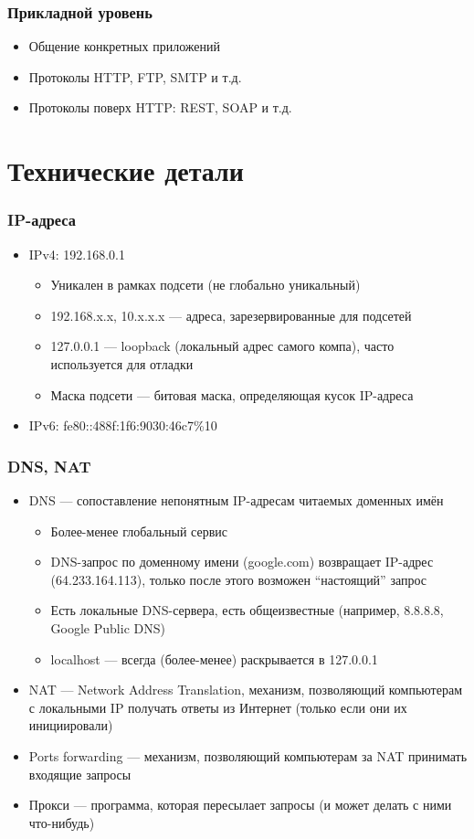\documentclass[xetex,mathserif,serif]{beamer}
\begin{document}
	\begin{frame}
		\frametitle{Прикладной уровень}
		\begin{itemize}
			\item Общение конкретных приложений
			\item Протоколы HTTP, FTP, SMTP и т.д.
			\item Протоколы поверх HTTP: REST, SOAP и т.д.
		\end{itemize}
	\end{frame}

	\section{Технические детали}

	\begin{frame}
		\frametitle{IP-адреса}
		\begin{itemize}
			\item IPv4: 192.168.0.1
			\begin{itemize}
				\item Уникален в рамках подсети (не глобально уникальный)
				\item 192.168.x.x, 10.x.x.x --- адреса, зарезервированные для подсетей
				\item 127.0.0.1 --- loopback (локальный адрес самого компа), часто используется для отладки
				\item Маска подсети --- битовая маска, определяющая кусок IP-адреса
			\end{itemize}
			\item IPv6: fe80::488f:1f6:9030:46c7\%10
		\end{itemize}
	\end{frame}

	\begin{frame}
		\frametitle{DNS, NAT}
		\begin{itemize}
			\item DNS --- сопоставление непонятным IP-адресам читаемых доменных имён
			\begin{itemize}
				\item Более-менее глобальный сервис
				\item DNS-запрос по доменному имени (google.com) возвращает IP-адрес (64.233.164.113), только после этого возможен ``настоящий'' запрос
				\item Есть локальные DNS-сервера, есть общеизвестные (например, 8.8.8.8, Google Public DNS)
				\item localhost --- всегда (более-менее) раскрывается в 127.0.0.1
			\end{itemize}
			\item NAT --- Network Address Translation, механизм, позволяющий компьютерам с локальными IP получать ответы из Интернет (только если они их инициировали)
			\item Ports forwarding --- механизм, позволяющий компьютерам за NAT принимать входящие запросы
			\item Прокси --- программа, которая пересылает запросы (и может делать с ними что-нибудь)
		\end{itemize}
	\end{frame}
\end{document}
